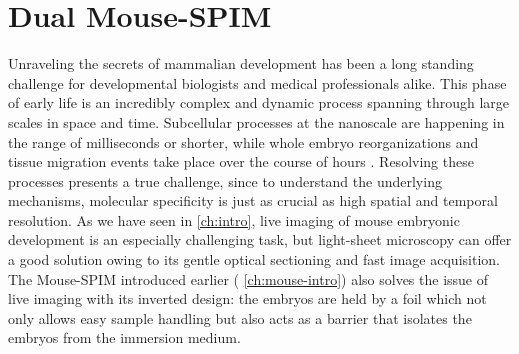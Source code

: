 

\chapter{Dual Mouse-SPIM}

\graphicspath{{./figures/2_DualMouse/}}

\label{ch:DualMouse}




Unraveling the secrets of mammalian development has been a long standing challenge for developmental biologists and medical professionals alike. 
This phase of early life is an incredibly complex and dynamic process spanning through large scales in space and time. Subcellular processes at the nanoscale are happening in the range of milliseconds or shorter, while whole embryo reorganizations and tissue migration events take place over the course of hours \cite{gilbert_developmental_2013}. Resolving these processes presents a true challenge, since to understand the underlying mechanisms, molecular specificity is just as crucial as high spatial and temporal resolution.
As we have seen in \autoref{ch:intro}, live imaging of mouse embryonic development is an especially challenging task, but light-sheet microscopy can offer a good solution owing to its gentle optical sectioning and fast image acquisition. The Mouse-SPIM \cite{strnad_inverted_2016} introduced earlier ( \autoref{ch:mouse-intro}) also solves the issue of live imaging with its inverted design: the embryos are held by a foil which not only allows easy sample handling but also acts as a barrier that isolates the embryos from the immersion medium.


